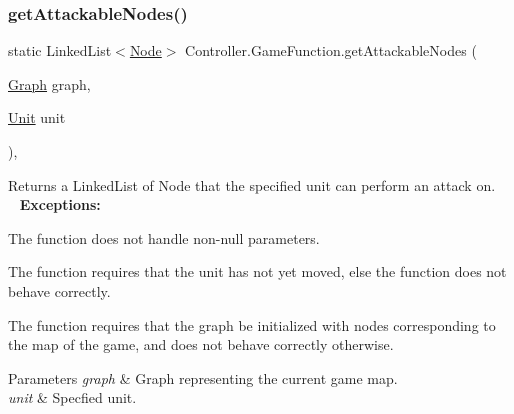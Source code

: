 \subsubsection{\texorpdfstring{get\+Attackable\+Nodes()}{getAttackableNodes()}}
{\footnotesize\ttfamily static Linked\+List$<$\hyperlink{class_model_1_1_map_module_1_1_node}{Node}$>$ Controller.\+Game\+Function.\+get\+Attackable\+Nodes (\begin{DoxyParamCaption}\item[{\hyperlink{class_model_1_1_map_module_1_1_graph}{Graph}}]{graph,  }\item[{\hyperlink{interface_model_1_1_unit_module_1_1_unit}{Unit}}]{unit }\end{DoxyParamCaption})\hspace{0.3cm}{\ttfamily [inline]}, {\ttfamily [static]}}

Returns a Linked\+List of Node that the specified unit can perform an attack on. ~\newline
~\newline
 {\bfseries Exceptions\+:} ~\newline

\begin{DoxyItemize}
\item The function does not handle non-\/null parameters.
\item The function requires that the unit has not yet moved, else the function does not behave correctly.
\item The function requires that the graph be initialized with nodes corresponding to the map of the game, and does not behave correctly otherwise. 
\begin{DoxyParams}{Parameters}
{\em graph} & Graph representing the current game map. \\
\hline
{\em unit} & Specfied unit. \\
\hline
\end{DoxyParams}

\end{DoxyItemize}\hypertarget{class_controller_1_1_game_function_a6b9f4cc1fad812ac925b242d0debe4a5}{}\label{class_controller_1_1_game_function_a6b9f4cc1fad812ac925b242d0debe4a5} 
